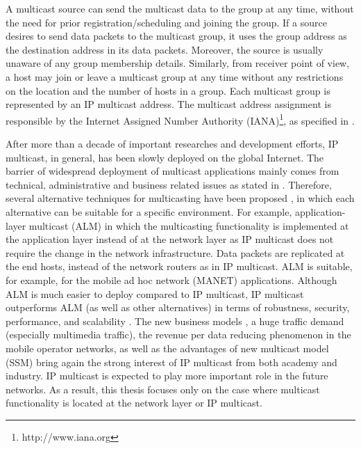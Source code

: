 A multicast source can send the multicast data to the group at any time, without the need for prior registration/scheduling and joining the group. If a source desires to send data packets to the multicast group, it uses the group address as the destination address in its data packets. Moreover, the source is usually unaware of any group membership details. Similarly, from receiver point of view, a host may join or leave a multicast group at any time without any restrictions on the location and the number of hosts in a group. Each multicast group is represented by an IP multicast address. The multicast address assignment is responsible by the Internet Assigned Number Authority (IANA)\footnote{http://www.iana.org}, as specified in \cite{iana_multicast_address}. 

After more than a decade of important researches and development efforts, IP multicast, in general, has been slowly deployed on the global Internet. The barrier of widespread deployment of multicast applications mainly comes from technical, administrative and business related issues as stated in \cite{alternative_multicast}. Therefore, several alternative techniques for multicasting have been proposed \cite{alternative_multicast}, in which each alternative can be suitable for a specific environment. For example, application-layer multicast (ALM) \cite{application_multicast} in which the multicasting functionality is implemented at the application layer instead of at the network layer as IP multicast does not require the change in the network infrastructure. Data packets are replicated at the end hosts, instead of the network routers as in IP multicast. ALM is suitable, for example, for the mobile ad hoc network (MANET) applications. Although ALM is much easier to deploy compared to IP multicast, IP multicast outperforms ALM (as well as other alternatives) in terms of robustness, security, performance, and scalability \cite{alternative_multicast}. The new business models \cite{ericsson_LTE}, a huge traffic demand (especially multimedia traffic), the revenue per data reducing phenomenon in the mobile operator networks, as well as the advantages of new multicast model (SSM) bring again the strong interest of IP multicast from both academy and industry. IP multicast is expected to play more important role in the future networks. As a result, this thesis focuses only on the case where multicast functionality is located at the network layer or IP multicast.  

